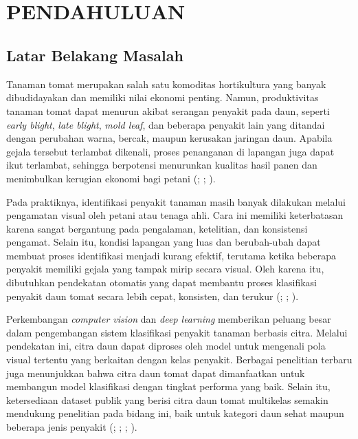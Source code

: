 
\chapter[PENDAHULUAN]{\\ PENDAHULUAN}

\section{Latar Belakang Masalah}
\begin{sectioncontent}
    \hspace{\parindent}Tanaman tomat merupakan salah satu komoditas hortikultura yang banyak dibudidayakan dan memiliki nilai ekonomi penting. Namun, produktivitas tanaman tomat dapat menurun akibat serangan penyakit pada daun, seperti \textit{early blight}, \textit{late blight}, \textit{mold leaf}, dan beberapa penyakit lain yang ditandai dengan perubahan warna, bercak, maupun kerusakan jaringan daun. Apabila gejala tersebut terlambat dikenali, proses penanganan di lapangan juga dapat ikut terlambat, sehingga berpotensi menurunkan kualitas hasil panen dan menimbulkan kerugian ekonomi bagi petani (\citealp[hlm. 1--3 dan 7]{jelali2024tomatoreview}; \citealp[hlm. 192--193 dan 199--200]{das2025tomatoreview}; \citealp[hlm. 1]{nyawose2025plantreview}).

    Pada praktiknya, identifikasi penyakit tanaman masih banyak dilakukan melalui pengamatan visual oleh petani atau tenaga ahli. Cara ini memiliki keterbatasan karena sangat bergantung pada pengalaman, ketelitian, dan konsistensi pengamat. Selain itu, kondisi lapangan yang luas dan berubah-ubah dapat membuat proses identifikasi menjadi kurang efektif, terutama ketika beberapa penyakit memiliki gejala yang tampak mirip secara visual. Oleh karena itu, dibutuhkan pendekatan otomatis yang dapat membantu proses klasifikasi penyakit daun tomat secara lebih cepat, konsisten, dan terukur (\citealp[hlm. 1--2]{jackulin2022plantreview}; \citealp[hlm. 1--3]{jelali2024tomatoreview}; \citealp[hlm. 192--193 dan 199--200]{das2025tomatoreview}).

    Perkembangan \textit{computer vision} dan \textit{deep learning} memberikan peluang besar dalam pengembangan sistem klasifikasi penyakit tanaman berbasis citra. Melalui pendekatan ini, citra daun dapat diproses oleh model untuk mengenali pola visual tertentu yang berkaitan dengan kelas penyakit. Berbagai penelitian terbaru juga menunjukkan bahwa citra daun tomat dapat dimanfaatkan untuk membangun model klasifikasi dengan tingkat performa yang baik. Selain itu, ketersediaan dataset publik yang berisi citra daun tomat multikelas semakin mendukung penelitian pada bidang ini, baik untuk kategori daun sehat maupun beberapa jenis penyakit (\citealp[hlm. 1]{imtiaz2025dataset}; \citealp[hlm. 1--2]{oni2025dataset}; \citealp[hlm. 1--2]{liu2025dataset}; \citealp[hlm. 1--2 dan 7--9]{sun2024tomatoclassification}).


\end{sectioncontent}
